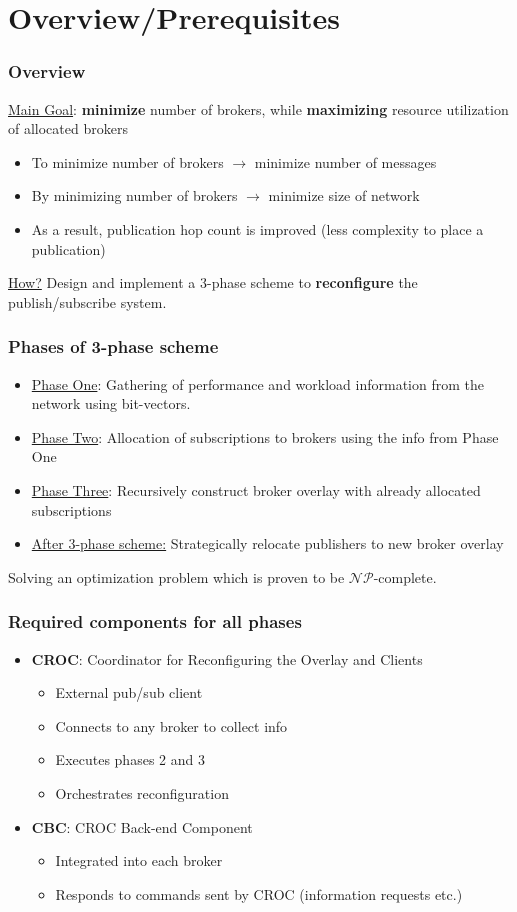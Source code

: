 \documentclass{beamer}
\begin{document}
\section{Overview/Prerequisites}
\begin{frame}
\frametitle{Overview}
\underline{Main Goal}: \textbf{minimize} number of brokers, while \textbf{maximizing} resource utilization of allocated brokers 
\begin{itemize}
\item To minimize number of brokers $\rightarrow$ minimize number of messages
\item By minimizing number of brokers $\rightarrow$ minimize size of network
\item As a result, publication hop count is improved (less complexity to place a publication)
\end{itemize}

\underline{How?}
Design and implement a 3-phase scheme to \textbf{reconfigure} the publish/subscribe system.
\end{frame}

\begin{frame}
\frametitle{Phases of 3-phase scheme}
\begin{itemize}
\item\underline{Phase One}: Gathering of performance and workload information from the network using bit-vectors.
\item\underline{Phase Two}: Allocation of subscriptions to brokers using the info from Phase One
\item\underline{Phase Three}: Recursively construct broker overlay with already allocated subscriptions
\item\underline{After 3-phase scheme:} Strategically relocate publishers to new broker overlay
\end{itemize}

Solving an optimization problem which is proven to be $\mathcal{NP}$-complete.

\end{frame}

\begin{frame}
\frametitle{Required components for all phases}
\begin{itemize}
\item \textbf{CROC}: Coordinator for Reconfiguring the Overlay and Clients
\begin{itemize}
\item External pub/sub client
\item Connects to any broker to collect info
\item Executes phases 2 and 3
\item Orchestrates reconfiguration
\end{itemize}
\item \textbf{CBC}: CROC Back-end Component
\begin{itemize}
\item Integrated into each broker
\item Responds to commands sent by CROC (information requests etc.)
\end{itemize}
\end{itemize}
\end{frame}
\end{document}
